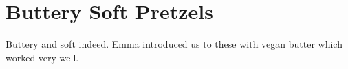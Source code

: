 \section[Soft Pretzels]{
    Buttery Soft Pretzels
}

\begin{recipestats}[
        servings=8 pretzels,
        preptime=\onehalf~\hour,
        inactivetime=1 \hour,
        bakingtime=20 \minute,
        source=Emma,
        original=\citefield{notChicken2019}{shorttitle}~\cite{notChicken2019},
    ]
\end{recipestats}

\begin{recipeabstract}
    Buttery and soft indeed.
    Emma introduced us to these with vegan butter which worked very well.
\end{recipeabstract}

\begin{ingredientcolumns}
    \begin{ingredientblock}
        \\
        \\
        \\
        \\
    \end{ingredientblock}
    \begin{ingredientblock}
        \\
        \\
        \\
    \end{ingredientblock}
\end{ingredientcolumns}


